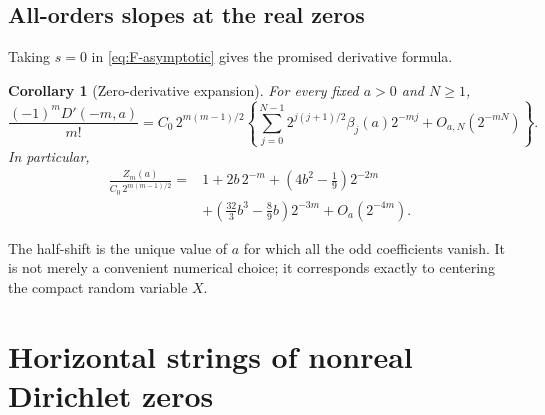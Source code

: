 \documentclass[11pt,a4paper]{article}
\numberwithin{equation}{section}
\newtheorem{corollary}[corollary]{Corollary}
\theoremstyle{definition}
\theoremstyle{remark}
\begin{document}
\subsection{All-orders slopes at the real zeros}
Taking $s=0$ in \cref{eq:F-asymptotic} gives the promised derivative
formula.
\begin{corollary}[Zero-derivative expansion]
\label{cor:Z-expansion}
For every fixed $a>0$ and $N\ge1$,
\begin{equation}
 \boxed{\displaystyle
 \frac{(-1)^mD'(-m,a)}{m!}
 =C_0\,2^{m(m-1)/2}
 \left\{\sum_{j=0}^{N-1}
 2^{j(j+1)/2}\beta_j(a)2^{-mj}+O_{a,N}(2^{-mN})\right\}.}
 \label{eq:Z-expansion}
\end{equation}
In particular,
\begin{align}
 \frac{Z_m(a)}{C_0\,2^{m(m-1)/2}}
 ={}&1+2b\,2^{-m}
   +\left(4b^2-\frac19\right)2^{-2m}\nonumber\\
 &+\left(\frac{32}3b^3-\frac89b\right)2^{-3m}
   +O_a(2^{-4m}).
 \label{eq:Z-first}
\end{align}
\end{corollary}
The half-shift is the unique value of $a$ for which all the odd
coefficients vanish. It is not merely a convenient numerical choice;
it corresponds exactly to centering the compact random variable $X$.

\section{Horizontal strings of nonreal Dirichlet zeros}
\label{sec:zeros}
\end{document}
